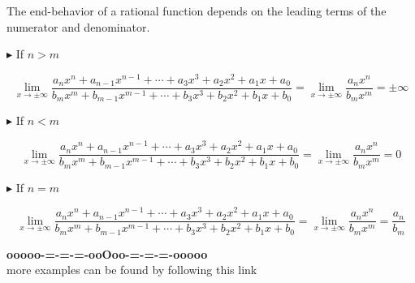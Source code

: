 \documentclass{ximera}
\begin{document}
The end-behavior of a rational function depends on the leading terms of the numerator and denominator.





\textbf{\textcolor{red!70!darkgray}{$\blacktriangleright$}} If $n > m$




\[   \lim\limits_{x \to \pm\infty}  \frac{ a_n x^n + a_{n-1} x^{n-1} + \cdots + a_3 x^3 + a_2 x^2 + a_1 x + a_0  } { b_m x^m + b_{m-1} x^{m-1} + \cdots + b_3 x^3 + b_2 x^2 + b_1 x + b_0 }   = \lim\limits_{x \to \pm\infty} \frac{ a_n x^n } { b_m x^m } = \pm \infty
\]











\textbf{\textcolor{red!70!darkgray}{$\blacktriangleright$}} If $n < m$




\[  \lim\limits_{x \to \pm\infty} \frac{ a_n x^n + a_{n-1} x^{n-1} + \cdots + a_3 x^3 + a_2 x^2 + a_1 x + a_0  } { b_m x^m + b_{m-1} x^{m-1} + \cdots + b_3 x^3 + b_2 x^2 + b_1 x + b_0 }   = \lim\limits_{x \to \pm\infty} \frac{ a_n x^n } { b_m x^m } = 0
\]











\textbf{\textcolor{red!70!darkgray}{$\blacktriangleright$}} If $n = m$




\[  \lim\limits_{x \to \pm\infty} \frac{ a_n x^n + a_{n-1} x^{n-1} + \cdots + a_3 x^3 + a_2 x^2 + a_1 x + a_0  } { b_m x^m + b_{m-1} x^{m-1} + \cdots + b_3 x^3 + b_2 x^2 + b_1 x + b_0 }   =  \lim\limits_{x \to \pm\infty} \frac{ a_n x^n } { b_m x^m } = \frac{ a_n} { b_m }
\]




























\begin{center}
\textbf{\textcolor{green!50!black}{ooooo-=-=-=-ooOoo-=-=-=-ooooo}} \\

more examples can be found by following this link\\ 

\end{center}
\end{document}
